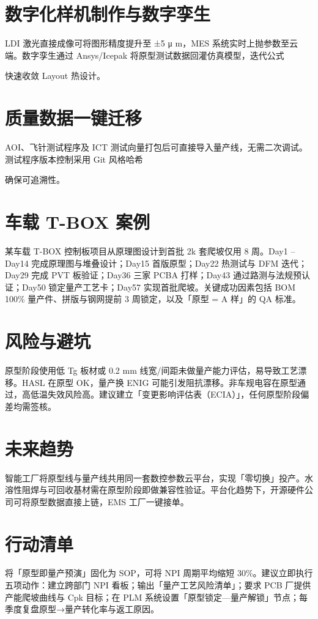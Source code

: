 \chapter{数字化样机制作与数字孪生}
LDI 激光直接成像可将图形精度提升至 ±5 μ m，MES 系统实时上抛参数至云端。数字孪生通过 Ansys/Icepak 将原型测试数据回灌仿真模型，迭代公式\par
[
T\_{}\{{}\textbackslash{}text\{{}j,new\}{}\}{} = T\_{}\{{}\textbackslash{}text\{{}j,old\}{}\}{} + \textbackslash{}Delta T\_{}\{{}\textbackslash{}text\{{}measured\}{}\}{} - \textbackslash{}Delta T\_{}\{{}\textbackslash{}text\{{}sim\}{}\}{}
]\par
快速收敛 Layout 热设计。\par
\chapter{质量数据一键迁移}
AOI、飞针测试程序及 ICT 测试向量打包后可直接导入量产线，无需二次调试。测试程序版本控制采用 Git 风格哈希\par
[
\textbackslash{}text\{{}Hash\}{} = \textbackslash{}text\{{}SHA256\}{}(\textbackslash{}text\{{}TestVector\}{} || \textbackslash{}text\{{}TimeStamp\}{})
]\par
确保可追溯性。\par
\chapter{车载 T-BOX 案例}
某车载 T-BOX 控制板项目从原理图设计到首批 2k 套爬坡仅用 8 周。Day1 – Day14 完成原理图与堆叠设计；Day15 首版原型；Day22 热测试与 DFM 迭代；Day29 完成 PVT 板验证；Day36 三家 PCBA 打样；Day43 通过路测与法规预认证；Day50 锁定量产工艺卡；Day57 实现首批爬坡。关键成功因素包括 BOM 100\%{} 量产件、拼版与钢网提前 3 周锁定，以及「原型 = A 样」的 QA 标准。\par
\chapter{风险与避坑}
原型阶段使用低 Tg 板材或 0.2 mm 线宽/间距未做量产能力评估，易导致工艺漂移。HASL 在原型 OK，量产换 ENIG 可能引发阻抗漂移。非车规电容在原型通过，高低温失效风险高。建议建立「变更影响评估表（ECIA）」，任何原型阶段偏差均需签核。\par
\chapter{未来趋势}
智能工厂将原型线与量产线共用同一套数控参数云平台，实现「零切换」投产。水溶性阻焊与可回收基材需在原型阶段即做兼容性验证。平台化趋势下，开源硬件公司可将原型数据直接上链，EMS 工厂一键接单。\par
\chapter{行动清单}
将「原型即量产预演」固化为 SOP，可将 NPI 周期平均缩短 30\%{}。建议立即执行五项动作：建立跨部门 NPI 看板；输出「量产工艺风险清单」；要求 PCB 厂提供产能爬坡曲线与 Cpk 目标；在 PLM 系统设置「原型锁定—量产解锁」节点；每季度复盘原型→量产转化率与返工原因。\par
